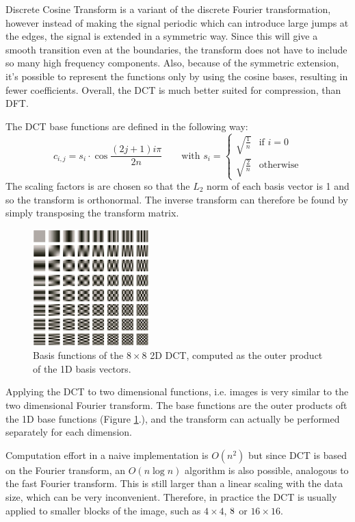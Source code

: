 \documentclass{diploma_style}
\begin{document}
Discrete Cosine Transform is a variant of the discrete Fourier transformation, however instead of making the signal periodic which can introduce large jumps at the edges, the signal is extended in a symmetric way. Since this will give a smooth transition even at the boundaries, the transform does not have to include so many high frequency components. Also, because of the symmetric extension, it's possible to represent the functions only by using the cosine bases, resulting in fewer coefficients. Overall, the DCT is much better suited for compression, than DFT.

The DCT base functions are defined in the following way:
\begin{equation}
c_{i,j} = s_i \cdot \cos \frac{(2j+1)i\pi}{2n} \qquad \text{with } s_i = 
    \begin{cases}
        \sqrt{\frac{1}{n}} & \text{if } i=0 \\
        \sqrt{\frac{2}{n}} & \text{otherwise}
    \end{cases}
\end{equation}
The scaling factors is are chosen so that the $L_2$ norm of each basis vector is 1 and
so the transform is orthonormal. The inverse transform can therefore be found by
simply transposing the transform matrix.

\begin{figure}
\centering
\includegraphics[width=0.4\textwidth]{figures/3_compression/DCT_bases}
\caption{Basis functions of the $8 \times 8$ 2D DCT, computed as the outer product of the 1D basis vectors.}
\label{fig:DCT_bases}
\end{figure}

Applying the DCT to two dimensional functions, i.e. images is very similar to the two dimensional Fourier transform. The base functions are the outer products oft the 1D base functions (Figure \ref{fig:DCT_bases}.), and the transform can actually be performed separately for each dimension.

Computation effort in a naive implementation is $O(n^2)$ but since DCT is based on the Fourier transform, an $O(n \log n)$ algorithm is also possible, analogous to the fast Fourier transform. This is still larger than a linear scaling with the data size, which can be very inconvenient. Therefore, in practice the DCT is usually applied to smaller blocks of the image, such as $4\times4$, $8\time8$ or $16\times16$. 
\end{document}
